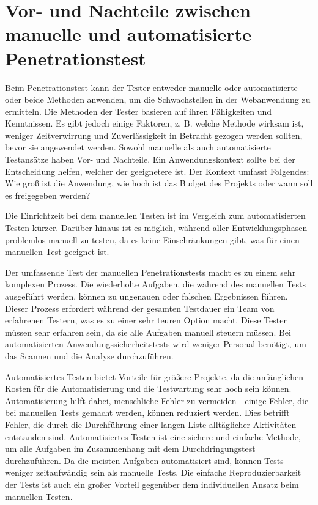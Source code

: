 \section{Vor- und Nachteile zwischen manuelle und automatisierte Penetrationstest}

Beim Penetrationstest kann der Tester entweder manuelle oder automatisierte oder beide Methoden anwenden, um die Schwachstellen in der Webanwendung zu ermitteln. Die Methoden der Tester basieren auf ihren Fähigkeiten und Kenntnissen. Es gibt jedoch einige Faktoren, z. B. welche Methode wirksam ist, weniger Zeitverwirrung und Zuverlässigkeit in Betracht gezogen werden sollten, bevor sie angewendet werden. Sowohl manuelle als auch automatisierte Testansätze haben Vor- und Nachteile. Ein Anwendungskontext sollte bei der Entscheidung helfen, welcher der geeignetere ist. Der Kontext umfasst Folgendes: Wie groß ist die Anwendung, wie hoch ist das Budget des Projekts oder wann soll es freigegeben werden? 

Die Einrichtzeit bei dem manuellen Testen ist im Vergleich zum automatisierten Testen kürzer. Darüber hinaus ist es möglich, während aller Entwicklungsphasen problemlos manuell zu testen, da es keine Einschränkungen gibt, was für einen manuellen Test geeignet ist. 

Der umfassende Test der manuellen Penetrationstests macht es zu einem sehr komplexen Prozess. Die wiederholte Aufgaben, die während des manuellen Tests ausgeführt werden, können zu ungenauen oder falschen Ergebnissen führen.  Dieser Prozess erfordert während der gesamten Testdauer ein Team von erfahrenen Testern, was es zu einer sehr teuren Option macht. Diese Tester müssen sehr erfahren sein, da sie alle Aufgaben manuell steuern müssen. Bei automatisierten Anwendungssicherheitstests wird weniger Personal benötigt, um das Scannen und die Analyse durchzuführen.

Automatisiertes Testen bietet Vorteile für größere Projekte, da die anfänglichen Kosten für die Automatisierung und die Testwartung sehr hoch sein können. Automatisierung hilft dabei, menschliche Fehler zu vermeiden - einige Fehler, die bei manuellen Tests gemacht werden, können reduziert werden. Dies betrifft Fehler, die durch die Durchführung einer langen Liste alltäglicher Aktivitäten entstanden sind. Automatisiertes Testen ist eine sichere und einfache Methode, um alle Aufgaben im Zusammenhang mit dem Durchdringungstest durchzuführen. Da die meisten Aufgaben automatisiert sind, können Tests weniger zeitaufwändig sein als manuelle Tests. Die einfache Reproduzierbarkeit der Tests ist auch ein großer Vorteil gegenüber dem individuellen Ansatz beim manuellen Testen\cite{autovorteil99}.

